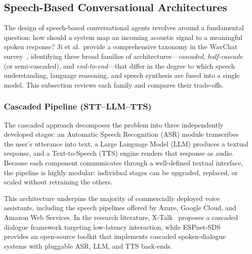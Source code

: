 
\subsection{Speech-Based Conversational Architectures}
\label{subsec:speech-architectures}

The design of speech-based conversational agents revolves around a fundamental
question: how should a system map an incoming acoustic signal to a meaningful
spoken response?  Ji et al.\ provide a comprehensive taxonomy in the WavChat
survey~\cite{ji2024wavechat}, identifying three broad families of
architectures---\emph{cascaded}, \emph{half-cascade} (or semi-cascaded), and
\emph{end-to-end}---that differ in the degree to which speech understanding,
language reasoning, and speech synthesis are fused into a single model.  This
subsection reviews each family and compares their trade-offs.

\subsubsection{Cascaded Pipeline (STT--LLM--TTS)}
\label{sssec:cascaded}

The cascaded approach decomposes the problem into three independently developed
stages: an Automatic Speech Recognition (ASR) module transcribes the user's
utterance into text, a Large Language Model (LLM) produces a textual response,
and a Text-to-Speech (TTS) engine renders that response as audio.  Because each
component communicates through a well-defined textual interface, the pipeline is
highly modular: individual stages can be upgraded, replaced, or scaled without
retraining the others.

This architecture underpins the majority of commercially deployed voice
assistants, including the speech pipelines offered by Azure, Google Cloud, and
Amazon Web Services.  In the research literature, X-Talk~\cite{lin2025xtalk}
proposes a cascaded dialogue framework targeting low-latency interaction, while
ESPnet-SDS~\cite{li2025espnetsds} provides an open-source toolkit that
implements cascaded spoken-dialogue systems with pluggable ASR, LLM, and TTS
back-ends.

